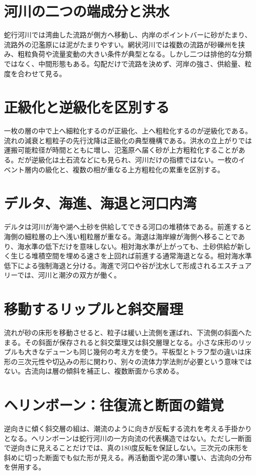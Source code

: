 \section{河川の二つの端成分と洪水}
\label{theory:sediment:river}
蛇行河川では湾曲した流路が側方へ移動し、内岸のポイントバーに砂がたまり、流路外の氾濫原には泥がたまりやすい。網状河川では複数の流路が砂礫州を挟み、粗粒負荷や流量変動の大きい条件が典型となる。しかし二つは排他的な分類ではなく、中間形態もある。勾配だけで流路を決めず、河岸の強さ、供給量、粒度を合わせて見る。\cite{sed_mit_environment}

\section{正級化と逆級化を区別する}
\label{theory:sediment:grading}
一枚の層の中で上へ細粒化するのが正級化、上へ粗粒化するのが逆級化である。流れの減衰と粗粒子の先行沈降は正級化の典型機構である。洪水の立上がりでは運搬可能粒径が時間とともに増し、氾濫原へ届く砂が上方粗粒化することがある。だが逆級化は土石流などにも見られ、河川だけの指標ではない。一枚のイベント層内の級化と、複数の相が重なる上方粗粒化の累重を区別する。

\section{デルタ、海進、海退と河口内湾}
\label{theory:sediment:delta}
デルタは河川が海や湖へ土砂を供給してできる河口の堆積体である。前進すると海側の細粒層の上へ浅い粗粒層が重なる。海退は海岸線が海側へ移ることであり、海水準の低下だけを意味しない。相対海水準が上がっても、土砂供給が新しく生じる堆積空間を埋める速さを上回れば前進する通常海退となる。相対海水準低下による強制海退と分ける。海進で河口や谷が沈水して形成されるエスチュアリーでは、河川と潮汐の双方が働く。\cite{sed_walther_oregon}

\section{移動するリップルと斜交層理}
\label{theory:sediment:cross}
流れが砂の床形を移動させると、粒子は緩い上流側を運ばれ、下流側の斜面へたまる。その斜面が保存されると斜交葉理又は斜交層理となる。小さな床形のリップルも大きなデューンも同じ幾何の考え方を使う。平板型とトラフ型の違いは床形の三次元性や切込みの形に関わり、別々の流体力学法則が必要という意味ではない。古流向は層の傾斜を補正し、複数断面から求める。\cite{sed_houston_structures}

\section{ヘリンボーン：往復流と断面の錯覚}
\label{theory:sediment:herringbone}
逆向きに傾く斜交層の組は、潮流のように向きが反転する流れを考える手掛かりとなる。ヘリンボーンは蛇行河川の一方向流の代表構造ではない。ただし一断面で逆向きに見えることだけでは、真の180度反転を保証しない。三次元の床形を斜めに切った断面でも似た形が見える。再活動面や泥の薄い覆い、古流向の分布を併用する。\cite{sed_mit_environment}

